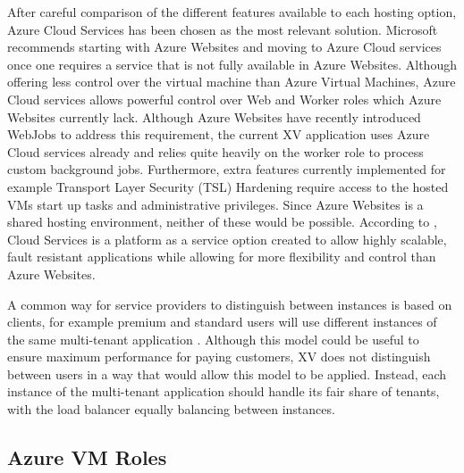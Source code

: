 After careful comparison of the different features available to each hosting option, Azure Cloud Services has been chosen as the most relevant solution. Microsoft recommends starting with Azure Websites and moving to Azure Cloud services once one requires a service that is not fully available in Azure Websites. Although offering less control over the virtual machine than Azure Virtual Machines, Azure Cloud services allows powerful control over Web and Worker roles which Azure Websites currently lack. Although Azure Websites have recently introduced WebJobs to address this requirement, the current XV application uses Azure Cloud services already and relies quite heavily on the worker role to process custom background jobs. Furthermore, extra features currently implemented for example Transport Layer Security (TSL) Hardening require access to the hosted VMs start up tasks and administrative privileges. Since Azure Websites is a shared hosting environment, neither of these would be possible.  According to \cite{Microsoft_Corporation_undated-ej}, Cloud Services is a platform as a service option created to allow highly scalable, fault resistant applications while allowing for more flexibility and control than Azure Websites.
 
A common way for service providers to distinguish between instances is based on clients, for example premium and standard users will use different instances of the same multi-tenant application \cite{Betts2012-ad}. Although this model could be useful to ensure maximum performance for paying customers, XV does not distinguish between users in a way that would allow this model to be applied. Instead, each instance of the multi-tenant application should handle its fair share of tenants, with the load balancer equally balancing between instances.

\subsection{Azure VM Roles}

